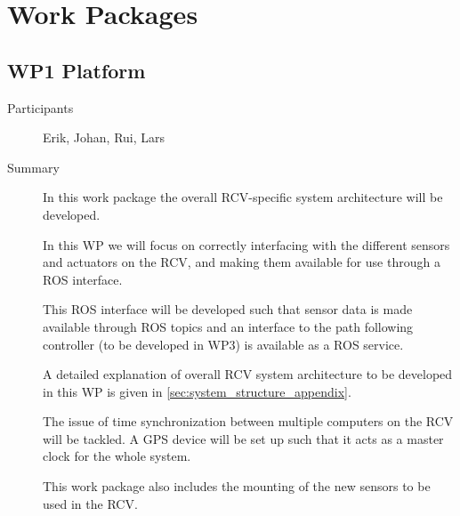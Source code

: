 \documentclass[11pt,a4paper]{article}
\begin{document}
\section{Work Packages}

\subsection{WP1 Platform} %

\begin{description}
\item[Participants] Erik, Johan, Rui, Lars
\item[Summary] In this work package the overall RCV-specific system architecture will be developed.


In this WP we will focus on correctly interfacing with the different sensors and actuators on the RCV, and making them available for use through a ROS interface.

This ROS interface will be developed such that sensor data is made available through ROS topics and an interface to the path following controller (to be developed in WP3) is available as a ROS service.

A detailed explanation of overall RCV system architecture to be developed in this WP is given in \ref{sec:system_structure_appendix}.

The issue of time synchronization between multiple computers on the RCV will be tackled. A GPS device will be set up such that it acts as a master clock for the whole system.

This work package also includes the mounting of the new sensors to be used in the RCV.



\end{description}
\end{document}
